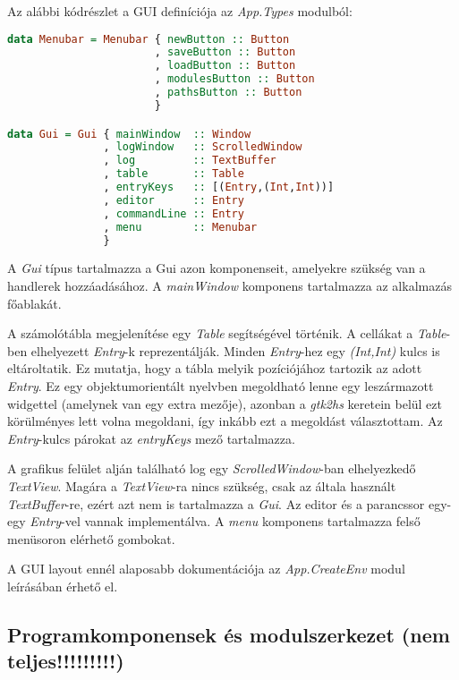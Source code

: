 Az alábbi kódrészlet a GUI definíciója az \textit{App.Types} modulból:

\begin{lstlisting}[language={Haskell}]
data Menubar = Menubar { newButton :: Button
                       , saveButton :: Button
                       , loadButton :: Button
                       , modulesButton :: Button
                       , pathsButton :: Button
                       }

data Gui = Gui { mainWindow  :: Window
               , logWindow   :: ScrolledWindow
               , log         :: TextBuffer
               , table       :: Table
               , entryKeys   :: [(Entry,(Int,Int))]
               , editor      :: Entry
               , commandLine :: Entry
               , menu        :: Menubar
               }
\end{lstlisting}

A \textit{Gui} típus tartalmazza a Gui azon komponenseit, amelyekre szükség van a handlerek hozzáadásához. A \textit{mainWindow} komponens tartalmazza az alkalmazás főablakát. 

A számolótábla megjelenítése egy \textit{Table} segítségével történik. A cellákat a \textit{Table}-ben elhelyezett \textit{Entry}-k reprezentálják. Minden \textit{Entry}-hez egy \textit{(Int,Int)} kulcs is eltároltatik. Ez mutatja, hogy a tábla melyik pozíciójához tartozik az adott \textit{Entry}. Ez egy objektumorientált nyelvben megoldható lenne egy leszármazott widgettel (amelynek van egy extra mezője), azonban a \textit{gtk2hs} keretein belül ezt körülményes lett volna megoldani, így inkább ezt a megoldást választottam. Az \textit{Entry}-kulcs párokat az \textit{entryKeys} mező tartalmazza.

A grafikus felület alján található log egy \textit{ScrolledWindow}-ban elhelyezkedő \textit{TextView}. Magára a \textit{TextView}-ra nincs szükség, csak az általa használt \textit{TextBuffer}-re, ezért azt nem is tartalmazza a \textit{Gui}. Az editor és a parancssor egy-egy \textit{Entry}-vel vannak implementálva. A \textit{menu} komponens tartalmazza felső menüsoron elérhető gombokat. 

A GUI layout ennél alaposabb dokumentációja az \textit{App.CreateEnv} modul leírásában érhető el. 

\subsection{Programkomponensek és modulszerkezet (nem teljes!!!!!!!!!)}

